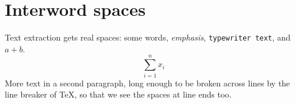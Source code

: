 \documentclass{article}
\begin{document}
\section{Interword spaces}
Text extraction gets real spaces: some words, \emph{emphasis}, \texttt{typewriter text}, and $a+b$.
\[ \sum_{i=1}^n x_i \]
More text in a second paragraph, long enough to be broken across lines by the line breaker of \TeX, so that we see
the spaces at line ends too.
\end{document}
